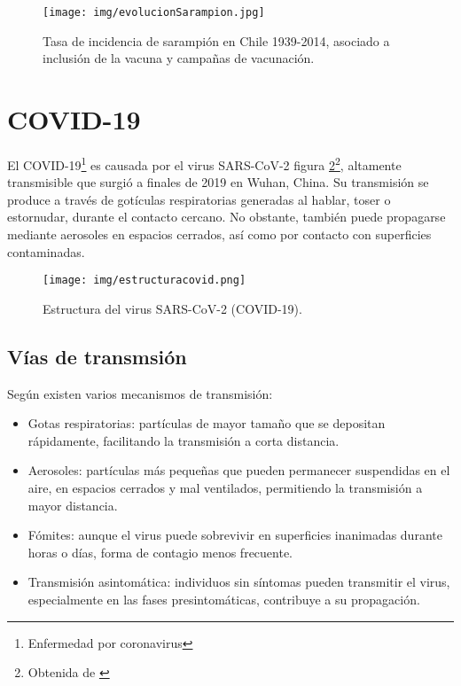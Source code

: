 \begin{enumerate}
\begin{figure}[H]
        \centering
        \texttt{[image: img/evolucionSarampion.jpg]}
        \caption{Tasa de incidencia de sarampión en Chile 1939-2014, asociado a inclusión de la vacuna y campañas de vacunación.}
        \label{fig:evolución sarampión}
        \vspace{0.5cm} %
\end{figure}

\section{COVID-19}
El COVID-19\footnote{Enfermedad por coronavirus} es causada por el virus SARS-CoV-2 figura \ref{fig:covid estructura}\footnote{Obtenida de \cite{medlineplus_sarscov2}}, altamente transmisible que surgió a finales de 2019 en Wuhan, China. Su transmisión se produce a través de gotículas respiratorias generadas al hablar, toser o estornudar, durante el contacto cercano. No obstante, también puede propagarse mediante aerosoles en espacios cerrados, así como por contacto con superficies contaminadas.

\begin{figure}[H]
        \centering
        \texttt{[image: img/estructuracovid.png]}
        \caption{Estructura del virus SARS-CoV-2 (COVID-19).}
        \label{fig:covid estructura}
        \vspace{0.5cm} %
\end{figure}

\subsection{Vías de transmsión}
Según \cite{wiersinga2020covid19}existen varios mecanismos de transmisión:
\begin{itemize}
    \item Gotas respiratorias: partículas de mayor tamaño que se depositan rápidamente, facilitando la transmisión a corta distancia.
    \item Aerosoles: partículas más pequeñas que pueden permanecer suspendidas en el aire, en espacios cerrados y mal ventilados, permitiendo la transmisión a mayor distancia.
    \item Fómites: aunque el virus puede sobrevivir en superficies inanimadas durante horas o días, forma de contagio menos frecuente.
    \item Transmisión asintomática: individuos sin síntomas pueden transmitir el virus, especialmente en las fases presintomáticas, contribuye a su propagación.
\end{itemize}


\end{enumerate}
